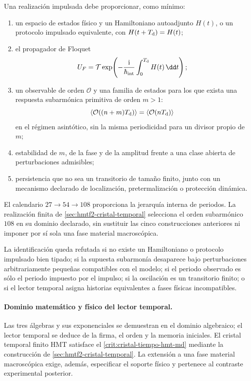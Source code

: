Una realización impulsada debe proporcionar, como mínimo:
\begin{enumerate}
 \item un espacio de estados físico y un Hamiltoniano autoadjunto
 \(H(t)\), o un protocolo impulsado equivalente, con
 \(H(t+T_{\rm d})=H(t)\);
 \item el propagador de Floquet
 \[
  U_F=\mathcal T\exp\!\left(
  -\frac{\mathrm i}{\hbar_{\rm int}}
  \int_0^{T_{\rm d}}H(t)\,\dd t\right);
 \]
 \item un observable de orden \(\mathcal O\) y una familia de estados para
 los que exista una respuesta subarmónica primitiva de orden \(m>1\):
 \[
  \langle\mathcal O((n+m)T_{\rm d})\rangle
  =\langle\mathcal O(nT_{\rm d})\rangle
 \]
 en el régimen asintótico, sin la misma periodicidad para un divisor propio
 de \(m\);
 \item estabilidad de \(m\), de la fase y de la amplitud frente a una clase
 abierta de perturbaciones admisibles;
 \item persistencia que no sea un transitorio de tamaño finito, junto con un
 mecanismo declarado de localización, pretermalización o protección
 dinámica.
\end{enumerate}
El calendario \(27\to54\to108\) proporciona la jerarquía interna de periodos.
La realización finita de \cref{sec:hmtf2-cristal-temporal} selecciona el orden
subarmónico \(108\) en su dominio declarado, sin sustituir las cinco
construcciones anteriores ni imponer por sí sola una fase material
macroscópica.

\begin{criterion}
\label{crit:cristal-tiempo-hmt-md}
La identificación queda refutada si no existe un Hamiltoniano o protocolo
impulsado bien tipado; si la supuesta subarmonía desaparece bajo
perturbaciones arbitrariamente pequeñas compatibles con el modelo; si el
periodo observado es sólo el periodo impuesto por el impulso; si la
oscilación es un transitorio finito; o si el lector temporal asigna historias
equivalentes a fases físicas incompatibles.
\end{criterion}

\paragraph{Dominio matemático y físico del lector temporal.}
Las tres álgebras y sus exponenciales se demuestran en el dominio algebraico;
el lector temporal se deduce de la firma, el orden y la memoria iniciales. El
cristal temporal finito HMT satisface el
\cref{crit:cristal-tiempo-hmt-md} mediante la construcción de
\cref{sec:hmtf2-cristal-temporal}. La extensión a una fase material
macroscópica exige, además, especificar el soporte físico y pertenece al
contraste experimental posterior.
